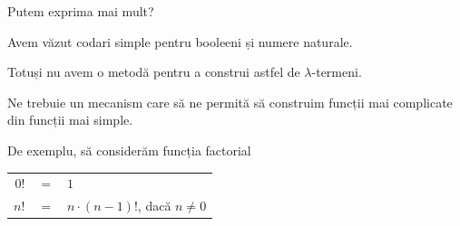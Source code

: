 \documentclass[xcolor=pdftex,romanian,colorlinks]{beamer}
\begin{document}
%
%
%
%
%
%
%

\begin{frame}{Putem exprima mai mult?}

Avem văzut  codari simple pentru booleeni și numere naturale. 

Totuși nu avem o metodă pentru a construi astfel de $\lambda$-termeni.

Ne trebuie un mecanism care să ne permită să construim funcții mai complicate din funcții mai simple.

De exemplu, să considerăm funcția factorial
\vspace{-.2cm}
\begin{center}
\begin{tabular}{rcl}
$0!$ & $=$ & $1$ \\
$n!$ & $=$ & $n \cdot (n-1)!$, \hspace{.4cm} dacă $n \neq 0$ 
\end{tabular}
\end{center}

\end{frame}
\end{document}
